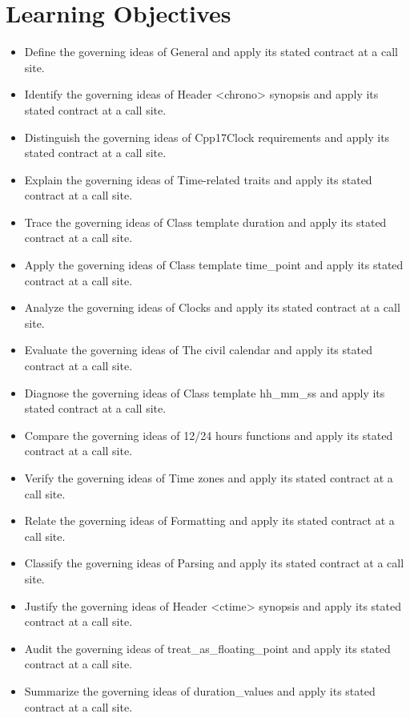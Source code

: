 \documentclass[11pt,letterpaper]{article}
\begin{document}
\section{Learning Objectives}
\begin{itemize}[label=\textcolor{CornellReferenceTeal}{$\blacktriangleright$}]
\item Define the governing ideas of General and apply its stated contract at a call site.
\item Identify the governing ideas of Header <chrono> synopsis and apply its stated contract at a call site.
\item Distinguish the governing ideas of Cpp17Clock requirements and apply its stated contract at a call site.
\item Explain the governing ideas of Time-related traits and apply its stated contract at a call site.
\item Trace the governing ideas of Class template duration and apply its stated contract at a call site.
\item Apply the governing ideas of Class template time\_\allowbreak{}point and apply its stated contract at a call site.
\item Analyze the governing ideas of Clocks and apply its stated contract at a call site.
\item Evaluate the governing ideas of The civil calendar and apply its stated contract at a call site.
\item Diagnose the governing ideas of Class template hh\_\allowbreak{}mm\_\allowbreak{}ss and apply its stated contract at a call site.
\item Compare the governing ideas of 12/24 hours functions and apply its stated contract at a call site.
\item Verify the governing ideas of Time zones and apply its stated contract at a call site.
\item Relate the governing ideas of Formatting and apply its stated contract at a call site.
\item Classify the governing ideas of Parsing and apply its stated contract at a call site.
\item Justify the governing ideas of Header <ctime> synopsis and apply its stated contract at a call site.
\item Audit the governing ideas of treat\_\allowbreak{}as\_\allowbreak{}floating\_\allowbreak{}point and apply its stated contract at a call site.
\item Summarize the governing ideas of duration\_\allowbreak{}values and apply its stated contract at a call site.
\end{itemize}
\end{document}
